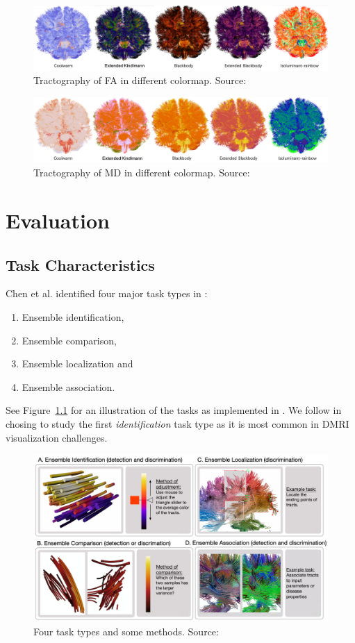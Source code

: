 \documentclass[a4paper, 12pt]{report}
\begin{document}
\begin{figure}[ht]
    \centering
    \includegraphics[width = 0.9\columnwidth]{7}
    \caption{Tractography of FA in different colormap. Source:  \cite{???}}
    \label{fig:7}
\end{figure}

\begin{figure}[ht]
    \centering
    \includegraphics[width = 0.9\columnwidth]{8}
    \caption{Tractography of MD in different colormap. Source:  \cite{???}}
    \label{fig:8}
\end{figure}

\chapter{Evaluation}
\section{Task Characteristics}

Chen et al. identified four major task types in \cite{chen}: 
\begin{enumerate}
	\item Ensemble identification, 
	\item Ensemble comparison, 
	\item Ensemble localization and
	\item Ensemble association.
\end{enumerate}
See Figure~\ref{fig:task-types} for an illustration of the tasks as implemented in \cite{chen}. We follow \cite{chen} in chosing to study the first \emph{identification} task type as it is most common in DMRI visualization challenges. 

\begin{figure}[ht]
    \centering
    \includegraphics[width = 0.9\columnwidth]{task-types}
    \caption{Four task types and some methods. Source:  \cite{chen}}
    \label{fig:task-types}
\end{figure}
\end{document}
